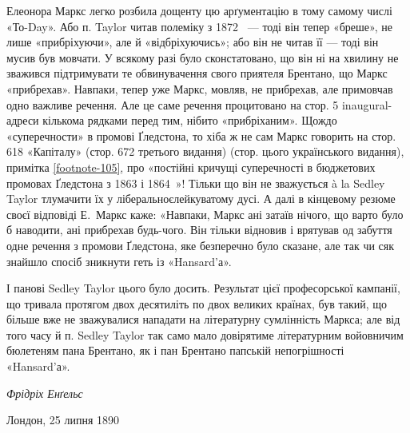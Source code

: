 Елеонора Маркс легко розбила дощенту цю арґументацію в тому самому числі «То-Day». Або п. Taylor
читав полеміку з 1872~ — тоді він тепер «бреше», не лише «прибріхуючи», але й «відбріхуючись»; або
він не читав її — тоді він мусив був
мовчати. У всякому разі було сконстатовано, що він ні на хвилину не зважився підтримувати те
обвинувачення свого приятеля Брентано, що Маркс «прибрехав». Навпаки, тепер уже Маркс, мовляв, не
прибрехав, але примовчав одно важливе речення. Але це саме речення процитовано на стор. 5
inaugural-адреси кількома рядками перед тим, нібито «прибріханим». Щождо «суперечности» в промові
Ґледстона, то хіба ж не сам Маркс говорить на стор. 618 «Капіталу» (стор. 672 третього видання)
(стор. \pageref{footnote-105} цього українського видання), примітка \ref{footnote-105}, про «постійні кричущі суперечності в бюджетових
промовах Ґледстона з 1863 і 1864~»! Тільки що
він не зважується à la Sedley Taylor тлумачити їх у ліберальноєлейкуватому
дусі. А далі в кінцевому резюме своєї відповіді Е.~Маркс каже: «Навпаки, Маркс ані затаїв нічого, що
варто
було б наводити, ані прибрехав будь-чого. Він тільки відновив
і врятував од забуття одне речення з промови Ґледстона, яке безперечно
було сказане, але так чи сяк знайшло спосіб зникнути
геть із «Hansard’а».

І панові Sedley Taylor цього було досить. Результат цієї професорської
кампанії, що тривала протягом двох десятиліть
по двох великих країнах, був такий, що більше вже не зважувалися
нападати на літературну сумлінність Маркса; але від
того часу й п. Sedley Taylor так само мало довірятиме літературним
войовничим бюлетеням пана Брентано, як і пан Брентано
папській непогрішності «Hansard’а».

\begin{flushright}
\emph{Фрідріх Енґельс}
\end{flushright}

{\small Лондон, 25 липня 1890~}
